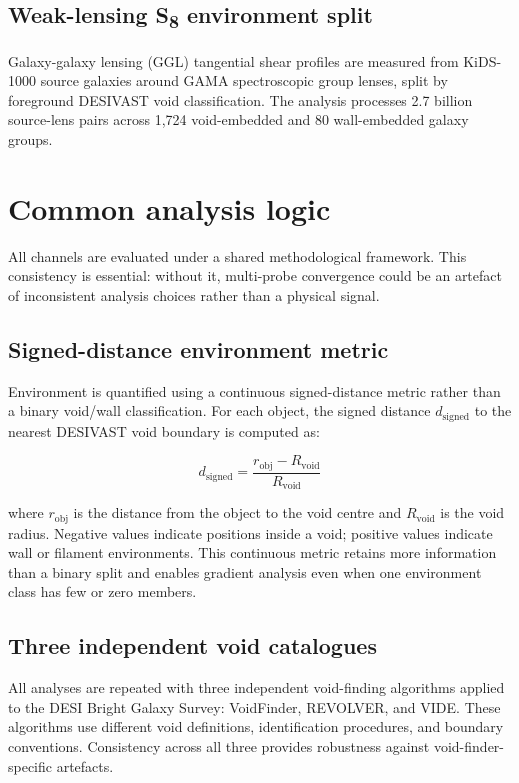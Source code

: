 \documentclass[11pt,a4paper]{article}
\begin{document}
\subsection{Weak-lensing S\textsubscript{8} environment split}
Galaxy-galaxy lensing (GGL) tangential shear profiles are measured from KiDS-1000 source galaxies around GAMA spectroscopic group lenses, split by foreground DESIVAST void classification. The analysis processes 2.7 billion source-lens pairs across 1,724 void-embedded and 80 wall-embedded galaxy groups.

\section{Common analysis logic}
\label{sec:sec4}
All channels are evaluated under a shared methodological framework. This consistency is essential: without it, multi-probe convergence could be an artefact of inconsistent analysis choices rather than a physical signal.

\subsection{Signed-distance environment metric}
Environment is quantified using a continuous signed-distance metric rather than a binary void/\allowbreak{}wall classification. For each object, the signed distance \(d_\mathrm{signed}\) to the nearest DESIVAST void boundary is computed as:

\[
d_\mathrm{signed} = \frac{r_\mathrm{obj} - R_\mathrm{void}}{R_\mathrm{void}}
\]

where \(r_\mathrm{obj}\) is the distance from the object to the void centre and \(R_\mathrm{void}\) is the void radius. Negative values indicate positions inside a void; positive values indicate wall or filament environments. This continuous metric retains more information than a binary split and enables gradient analysis even when one environment class has few or zero members.

\subsection{Three independent void catalogues}
All analyses are repeated with three independent void-finding algorithms applied to the DESI Bright Galaxy Survey: VoidFinder, REVOLVER, and VIDE. These algorithms use different void definitions, identification procedures, and boundary conventions. Consistency across all three provides robustness against void-finder-specific artefacts.
\end{document}

